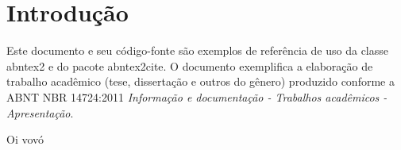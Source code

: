 \documentclass[12pt,openright,oneside,chapter=TITLE,section=TITLE,
	brazil]{utfpr-pg}
\begin{document}
\imprimircapa


    



\listofquadros

\textual

 \chapter{Introdução}

 Este documento e seu código-fonte são exemplos de referência de uso da classe
 \textsf{abntex2} e do pacote \textsf{abntex2cite}. O documento 
 exemplifica a elaboração de trabalho acadêmico (tese, dissertação e outros do
 gênero) produzido conforme a ABNT NBR 14724:2011 \emph{Informação e documentação
 - Trabalhos acadêmicos - Apresentação}.

\begin{quadro}[h]
  \caption{Oi vovó}
\end{quadro}


\end{document}
